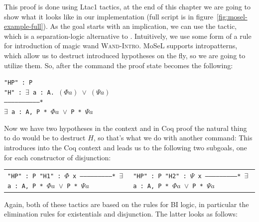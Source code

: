 This proof is done using Ltac1 tactics, at the end of this chapter we are going to show what it looks like in our implementation (full script is in figure~\ref{fig:mosel-example-full}).
As the goal starts with an implication, we can use the  tactic, which is a separation-logic alternative to .
Intuitively, we use some form of a rule for introduction of magic wand \textsc{Wand-Intro}.
MoSeL supports intropatterns, which allow us to destruct introduced hypotheses on the fly, so we are going to utilize them.
So, after the command  the proof state becomes the following:

\begin{minipage}[t]{\linewidth}
\texttt{"HP" : P\\
"H" : \(\exists\) a : A. \((\Phi a)\) \(\vee\) \((\Psi a)\)\\
------------------------------*\\
\(\exists\) a : A, P * \(\Phi a\) \(\vee\) P * \(\Psi a\)}
\end{minipage}

Now we have two hypotheses in the context and in Coq proof the natural thing to do would be to destruct \(H\), so that's what we do with another command: \linebreak[4] 
This introduces  into the Coq context and leads us to the following two subgoals, one for each constructor of disjunction:

\begin{minipage}[t]{\linewidth}
\begin{tabular}{l l}
  \parbox[t]{0.5\textwidth}{\texttt{"HP" : P\\
  "H1" : $\Phi$ x\\
  --------------------------*\\
  \(\exists\) a : A, P * \(\Phi a\) \(\vee\) P * \(\Psi a\)}} &
  \parbox[t]{0.5\textwidth}{\texttt{"HP" : P\\
  "H2" : $\Psi$ x\\
  --------------------------*\\
  \(\exists\) a : A, P * \(\Phi a\) \(\vee\) P * \(\Psi a\)}}
\end{tabular}
\end{minipage}

Again, both of these tactics are based on the rules for BI logic, in particular the elimination rules for existentials and disjunction.
The latter looks as follows:

